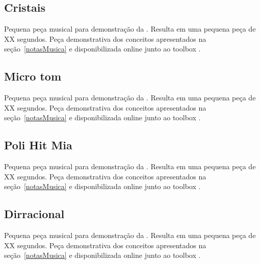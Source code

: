 \clearpage

\subsection{Cristais}\label{ap:cristais}
Pequena peça musical para demonstração da . Resulta em uma pequena peça de XX segundos. Peça demonstrativa dos conceitos apresentados na seção~\ref{notasMusica} e disponibilizada online junto ao toolbox \massa.


\clearpage

\subsection{Micro tom}\label{ap:micro}
Pequena peça musical para demonstração da . Resulta em uma pequena peça de XX segundos. Peça demonstrativa dos conceitos apresentados na seção~\ref{notasMusica} e disponibilizada online junto ao toolbox \massa.


\clearpage

\subsection{Poli Hit Mia}\label{ap:poli}
Pequena peça musical para demonstração da . Resulta em uma pequena peça de XX segundos. Peça demonstrativa dos conceitos apresentados na seção~\ref{notasMusica} e disponibilizada online junto ao toolbox \massa.


\clearpage

\subsection{Dirracional}\label{ap:dirracional}
Pequena peça musical para demonstração da . Resulta em uma pequena peça de XX segundos. Peça demonstrativa dos conceitos apresentados na seção~\ref{notasMusica} e disponibilizada online junto ao toolbox \massa.


